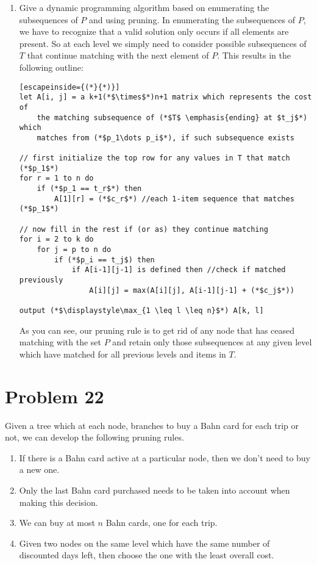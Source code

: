 \documentclass{article}
\providecommand{\prob}[1]{\section*{Problem #1}}
\begin{document}
\begin{enumerate}[label=(\alph*)]
        \item Give a dynamic programming algorithm based on enumerating the subsequences of $P$ and using pruning.
            In enumerating the subsequences of $P$, we have to recognize that a valid solution only occurs if all elements are present. So at each level we simply need to consider possible subsequences of $T$ that continue matching with the next element of $P$. This results in the following outline:
            
            \begin{lstlisting}[escapeinside={(*}{*)}]
let A[i, j] = a k+1(*$\times$*)n+1 matrix which represents the cost of
    the matching subsequence of (*$T$ \emphasis{ending} at $t_j$*) which
    matches from (*$p_1\dots p_i$*), if such subsequence exists

// first initialize the top row for any values in T that match (*$p_1$*)
for r = 1 to n do
    if (*$p_1 == t_r$*) then
        A[1][r] = (*$c_r$*) //each 1-item sequence that matches (*$p_1$*)

// now fill in the rest if (or as) they continue matching 
for i = 2 to k do
    for j = p to n do
        if (*$p_i == t_j$) then
            if A[i-1][j-1] is defined then //check if matched previously
                A[i][j] = max(A[i][j], A[i-1][j-1] + (*$c_j$*))

output (*$\displaystyle\max_{1 \leq l \leq n}$*) A[k, l]
            \end{lstlisting}
    
    As you can see, our pruning rule is to get rid of any node that has ceased matching with the set $P$ and retain only those subsequences at any given level which have matched for all previous levels and items in $T$.
    \end{enumerate}

    \pagebreak
    \prob{22}
    Given a tree which at each node, branches to buy a Bahn card for each trip or not, we can develop the following pruning rules.
    \begin{enumerate}
        \item If there is a Bahn card active at a particular node, then we don't need to buy a new one.
        \item Only the last Bahn card purchased needs to be taken into account when making this decision.
        \item We can buy at most $n$ Bahn cards, one for each trip.
        \item Given two nodes on the same level which have the same number of discounted days left, then choose the one with the least overall cost.
    \end{enumerate}
\end{document}
